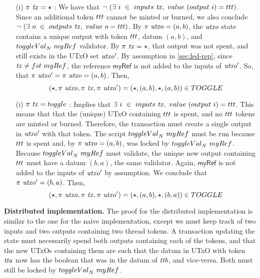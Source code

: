 \begin{itemize}
  \item[(i)] $\pi~\mathit{tx} = \star$ : We have that $\neg ~(\exists ~i~ \in~\inputs~\var{tx},~\val~(\fun{output}~i) = \fun{ttt})$. Since an additional token $\fun{ttt}$ cannot be minted or burned, we also conclude $ \neg ~(\exists  ~o~ \in~\fun{outputs}~\var{tx},~\val~o = \fun{ttt})$.
  By $\pi~\mathit{utxo} = (a, b)$, the $\mathit{utxo}$ state contains a unique output with
  token $\fun{ttt}$, datum $(a, b)$, and $\toggleVal_N~\fun{myRef}$ validator.
  By $\pi~\mathit{tx} = \star$, that output was not spent, and still exists in the
  UTxO set $\mathit{utxo'}$.
  By assumption in \ref{sec:led-rep}, since $\var{tx} \neq \fun{fst}~\mathsf{myRef}$,
  the reference $\mathsf{myRef}$ is not added to the inputs of $\mathit{utxo'}$.
  So, that $\pi~\mathit{utxo'} = \pi~\mathit{utxo} = (a, b)$.
  Then,
  \[ (\emptytype, \pi~\var{utxo}, \pi~\var{tx}, \pi~\var{utxo'}) = (\emptytype, (a, b), \emptytype, (a, b)) \in \TOGGLE \]

  \item[(i)] $\pi~\var{tx} = \toggle$ : Implies that $ \exists ~i~ \in~\inputs~\var{tx},~\val~(\fun{output}~i) = \fun{ttt} $. This means that that the (unique) UTxO containing $\fun{ttt}$ is spent,
  and no $\fun{ttt}$ tokens are minted or burned. Therefore,
  the transaction must create a single output in $\mathit{utxo'}$
  with that token. The script $\toggleVal_N~\fun{myRef}$ must be run because $\fun{ttt}$
  is spent and, by $\pi~\mathit{utxo} = (a, b)$, was locked by $\toggleVal_N~\fun{myRef}$.
  Because $\toggleVal_N~\fun{myRef}$
  must validate, the unique new output containing $\fun{ttt}$ must have a datum $(b, a)$,
  the same validator. Again, $\mathsf{myRef}$ is not added to the inputs of $\mathit{utxo'}$
  by assumption. We conclude that
  $\pi~\mathit{utxo'} = (b, a)$.
  Then,
  \[ (\emptytype, \pi~\var{utxo}, \pi~\var{tx}, \pi~\var{utxo'}) = (\emptytype, (a, b), \emptytype, (b, a)) \in \TOGGLE \]

\end{itemize}

\textbf{Distributed implementation. }
The proof for the distributed implementation is similar to the one for the
naive implementation, except we must keep track of two inputs and two outputs
containing two thread tokens. A transaction updating the state must necessarily
spend both outputs containing each of the tokens, and that the new UTxOs containing
them are such that the datum in UTxO with token $\mathit{tta}$ now has the boolean
that was in the datum of $\mathit{ttb}$, and vice-versa. Both must still be
 locked by $\toggleVal_N~\fun{myRef}$.
